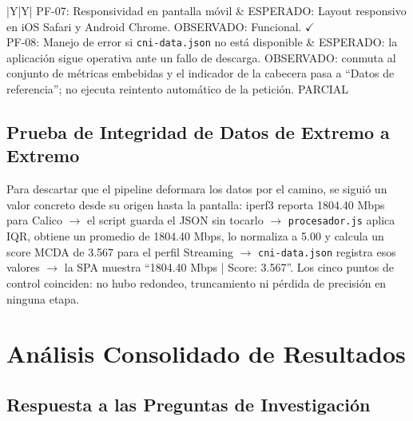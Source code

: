 \begin{table}[htbp]
\begin{tabularx}{\textwidth}{|Y|Y|}
\hline
PF-07: Responsividad en pantalla móvil & ESPERADO: Layout responsivo en iOS Safari y Android Chrome. OBSERVADO: Funcional. $\checkmark$ \\
\hline
PF-08: Manejo de error si \texttt{cni-data.json} no está disponible & ESPERADO: la aplicación sigue operativa ante un fallo de descarga. OBSERVADO: conmuta al conjunto de métricas embebidas y el indicador de la cabecera pasa a ``Datos de referencia''; no ejecuta reintento automático de la petición. PARCIAL \\
\hline
\end{tabularx}
\end{table}

\subsection{Prueba de Integridad de Datos de Extremo a Extremo}

Para descartar que el pipeline deformara los datos por el camino, se siguió un valor concreto desde su origen hasta la pantalla: iperf3 reporta 1804.40 Mbps para Calico $\rightarrow$ el script guarda el JSON sin tocarlo $\rightarrow$ \texttt{procesador.js} aplica IQR, obtiene un promedio de 1804.40 Mbps, lo normaliza a 5.00 y calcula un score MCDA de 3.567 para el perfil Streaming $\rightarrow$ \texttt{cni-data.json} registra esos valores $\rightarrow$ la SPA muestra ``1804.40 Mbps | Score: 3.567''. Los cinco puntos de control coinciden: no hubo redondeo, truncamiento ni pérdida de precisión en ninguna etapa.

\section{Análisis Consolidado de Resultados}

\subsection{Respuesta a las Preguntas de Investigación}


